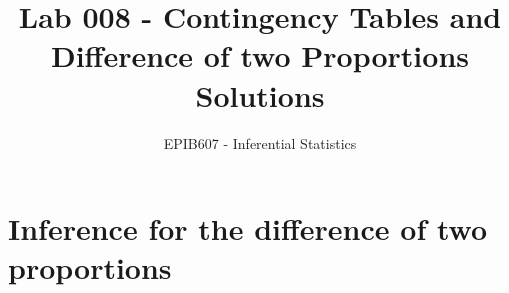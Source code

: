 \documentclass[letterpaper,12pt,twoside,]{pinp}
\title{Lab 008 - Contingency Tables and Difference of two Proportions Solutions}
\author[a]{EPIB607 - Inferential Statistics}
\affil[a]{Fall 2020, McGill University}
\begin{document}
\verticaladjustment{-2pt}

\maketitle
\thispagestyle{firststyle}



\hypertarget{inference-for-the-difference-of-two-proportions}{%
\section{Inference for the difference of two
proportions}\label{inference-for-the-difference-of-two-proportions}}
\end{document}
